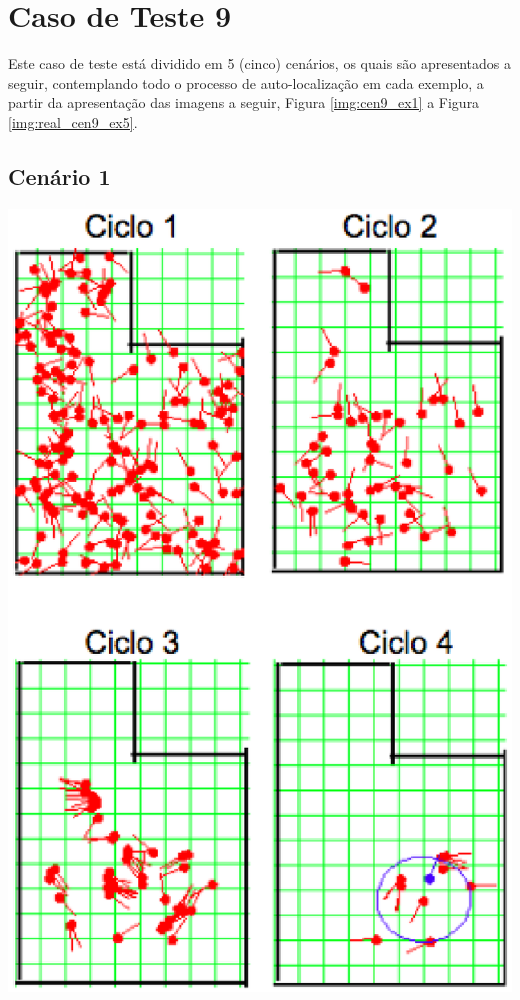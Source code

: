 \section{Caso de Teste 9}
\label{sec:cenario9}

Este caso de teste está dividido em 5 (cinco) cenários, os quais são apresentados a seguir, contemplando todo o processo de auto-localização
em cada exemplo, a partir da apresentação das imagens a seguir, Figura \ref{img:cen9_ex1} a Figura \ref{img:real_cen9_ex5}.

\subsection{Cenário 1}

{\centering
\includegraphics[scale=0.4]{figuras/cen9_ex1.eps}
\label{img:cen9_ex1}
\par}

